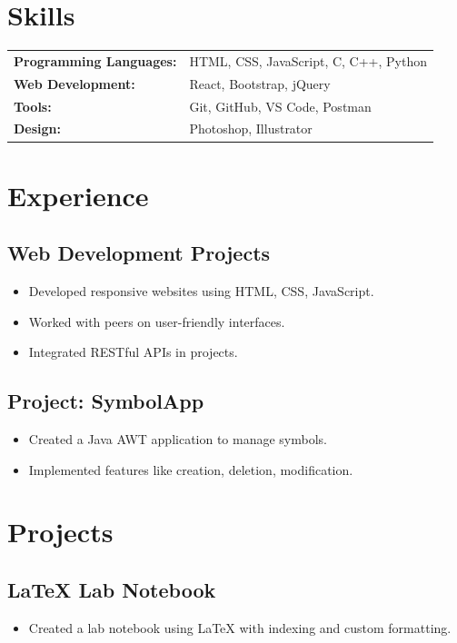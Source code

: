 \documentclass{article}
\begin{document}
\section*{Skills}
\begin{tabular}{p{} p{}}
    \textbf{Programming Languages:} & HTML, CSS, JavaScript, C, C++, Python \\
    \textbf{Web Development:} & React, Bootstrap, jQuery \\
    \textbf{Tools:} & Git, GitHub, VS Code, Postman \\
    \textbf{Design:} & Photoshop, Illustrator \\
\end{tabular}

\section*{Experience}
\subsection*{Web Development Projects}
\begin{itemize}[leftmargin=0.5cm]
    \item Developed responsive websites using HTML, CSS, JavaScript.
    \item Worked with peers on user-friendly interfaces.
    \item Integrated RESTful APIs in projects.
\end{itemize}

\subsection*{Project: SymbolApp}
\begin{itemize}[leftmargin=0.5cm]
    \item Created a Java AWT application to manage symbols.
    \item Implemented features like creation, deletion, modification.
\end{itemize}

\section*{Projects}
\subsection*{LaTeX Lab Notebook}
\begin{itemize}[leftmargin=0.5cm]
    \item Created a lab notebook using LaTeX with indexing and custom formatting.
\end{itemize}
\end{document}
